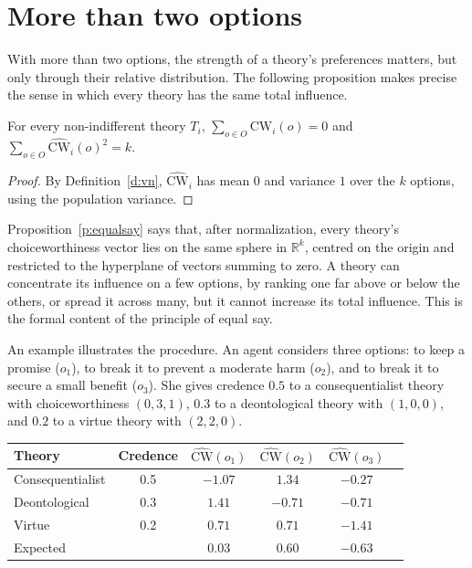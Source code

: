 \documentclass{situationist-preprint}
\begin{document}
\section{More than two options}

With more than two options, the strength of a theory's preferences matters, but only through their relative distribution. The following proposition makes precise the sense in which every theory has the same total influence.

\begin{proposition}\label{p:equalsay}
For every non-indifferent theory $T_i$, $\sum_{o \in O} \widehat{\mathrm{CW}}_i(o) = 0$ and $\sum_{o \in O} \widehat{\mathrm{CW}}_i(o)^2 = k$.
\end{proposition}

\begin{proof}
By Definition~\ref{d:vn}, $\widehat{\mathrm{CW}}_i$ has mean $0$ and variance $1$ over the $k$ options, using the population variance.
\end{proof}

Proposition~\ref{p:equalsay} says that, after normalization, every theory's choiceworthiness vector lies on the same sphere in $\mathbb{R}^k$, centred on the origin and restricted to the hyperplane of vectors summing to zero. A theory can concentrate its influence on a few options, by ranking one far above or below the others, or spread it across many, but it cannot increase its total influence. This is the formal content of the principle of equal say.

An example illustrates the procedure. An agent considers three options: to keep a promise ($o_1$), to break it to prevent a moderate harm ($o_2$), and to break it to secure a small benefit ($o_3$). She gives credence $0.5$ to a consequentialist theory with choiceworthiness $(0, 3, 1)$, $0.3$ to a deontological theory with $(1, 0, 0)$, and $0.2$ to a virtue theory with $(2, 2, 0)$.

\begin{center}\small
\begin{tabular}{@{}lccccc@{}}
\toprule
Theory & Credence & $\widehat{\mathrm{CW}}(o_1)$ & $\widehat{\mathrm{CW}}(o_2)$ & $\widehat{\mathrm{CW}}(o_3)$ \\
\midrule
Consequentialist & 0.5 & $-1.07$ & $1.34$ & $-0.27$ \\
Deontological & 0.3 & $1.41$ & $-0.71$ & $-0.71$ \\
Virtue & 0.2 & $0.71$ & $0.71$ & $-1.41$ \\
\midrule
Expected & & $0.03$ & $0.60$ & $-0.63$ \\
\bottomrule
\end{tabular}
\end{center}
\end{document}
